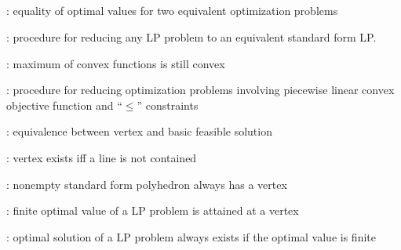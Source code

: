 \subsection*{}
\item {}: equality of optimal values for two equivalent optimization problems
\item {}: procedure for reducing any LP problem to an equivalent standard form LP.
\item {}: maximum of convex functions is still convex
\item {}: procedure for reducing optimization problems involving piecewise linear convex objective function and ``\(\leq\)'' constraints
\item {}: equivalence between vertex and basic feasible solution
\item {}: vertex exists iff a line is not contained
\item {}: nonempty standard form polyhedron always has a vertex
\item {}: finite optimal value of a LP problem is attained at a vertex
\item {}: optimal solution of a LP problem always exists if the optimal value is finite
